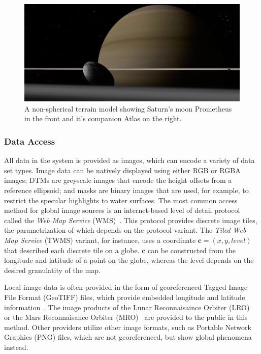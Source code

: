 \begin{figure}[b]
\centering
\includegraphics[width=\textwidth]{figures/contributions/gb/prometheus.png}
\caption{A non-spherical terrain model showing Saturn's moon Prometheus in the front and it's companion Atlas on the right.}
\label{contributions:astro:gb:prometheus}
\end{figure}


\subsubsection{Data Access} \label{contributions:astro:gb:access}
All data in the system is provided as  images, which can encode a variety of data set types.  Image data can be natively displayed using either RGB or RGBA images;  DTMs are greyscale images that encode the height offsets from a reference ellipsoid;  and masks are binary images that are used, for example, to restrict the specular highlights to water surfaces.  The most common access method for global image sources is an internet-based level of detail protocol called the \emph{Web Map Service} (WMS)~\cite{open2006opengis, maso2010opengis}.  This protocol provides discrete image tiles, the parametrization of which depends on the protocol variant.  The \emph{Tiled Web Map Service} (TWMS) variant, for instance, uses a  coordinate $\textbf{c} = (x,y,level)$ that described each discrete tile on a globe.  $\textbf{c}$ can be constructed from the longitude and latitude of a point on the globe, whereas the level depends on the desired granulatity of the map.

Local image data is often provided in the form of georeferenced Tagged Image File Format (GeoTIFF) files, which provide embedded longitude and latitude information~\cite{ritter2000geotiff}.  The image products of the Lunar Reconnaisaince Orbiter (LRO)~\cite{vondrak2010lunar} or the Mars Reconnaisance Orbiter (MRO)~\cite{mcewen2016people} are provided to the public in this method.  Other providers utilize other image formats, such as Portable Network Graphics (PNG) files, which are not georeferenced, but show global phenomena instead.

